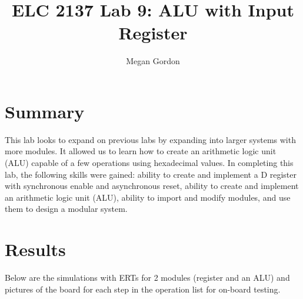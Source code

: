 \documentclass[11pt]{article}
\begin{document}
\title{ELC 2137 Lab 9: ALU with Input Register}
\author{Megan Gordon}

\maketitle


\section*{Summary}

This lab looks to expand on previous labs by expanding into larger systems with more modules. It allowed us to learn how to create an arithmetic logic unit (ALU) capable of a few operations using hexadecimal values. In completing this lab, the following skills were gained: ability to create and implement a D register with synchronous enable and asynchronous reset, ability to create and implement an arithmetic logic unit (ALU), ability to import and modify modules, and use them to design a modular system. 



\section*{Results}

Below are the simulations with ERTs for 2 modules (register and an ALU) and pictures of the board for each step in the operation list for on-board testing. 
\end{document}
